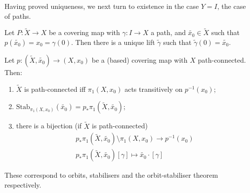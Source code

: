 \documentclass{article}
\numberwithin{nthm}{subsection}
\begin{document}
Having proved uniqueness, we next turn to existence in the case $Y = I$, the case of paths.

\begin{lemma}
    Let $P: \widetilde{X} \to X$ be a covering map with $\gamma:I \to X$ a path, and $\widetilde{x_0} \in \widetilde{X}$ such that $p(\widetilde{x_0}) = x_0 = \gamma(0)$.
    Then there is a unique lift $\widetilde{\gamma}$ such that $\widetilde{\gamma}(0) = \widetilde{x_0}$.
\end{lemma}


\begin{lemma}
    Let $p:(\widetilde{X}, \widetilde{x_0}) \to (X, x_0)$ be a (based) covering map with $X$ path-connected. Then:
    \begin{enumerate}[label=(\roman*)]
        \item $\widetilde{X}$ is path-connected iff $\pi_1(X, x_0)$ acts transitively on $p^{-1}(x_0)$;
        \item $\mathrm{Stab}_{\pi_1(X, x_0)} (\widetilde{x_0}) = p_* \pi_1(\widetilde{X}, \widetilde{x_0})$;
        \item there is a bijection (if $\widetilde{X}$ is path-connected)
            \begin{align*}
                p_* \pi_1 (\widetilde{X}, \widetilde{x_0}) \setminus \pi_1(X, x_0) \rightarrow p^{-1} (x_0) \\
                p_* \pi_1 (\widetilde{X}, \widetilde{x_0})[\gamma] \longmapsto \widetilde{x_0} \cdot [\gamma]
            \end{align*}
    \end{enumerate}
    These correspond to orbits, stabilisers and the orbit-stabiliser theorem respectively.
\end{lemma}
\end{document}
